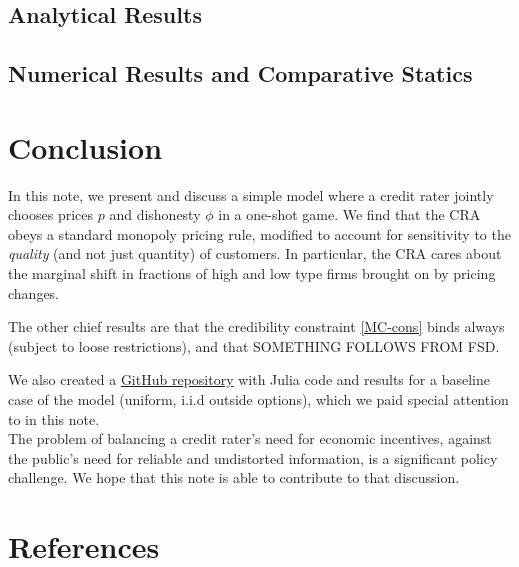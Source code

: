 \documentclass{article}
\theoremstyle{definition}
\begin{document}
\subsection{Analytical Results}

\subsection{Numerical Results and Comparative Statics}

\newpage

\section{Conclusion}

In this note, we present and discuss a simple model where a credit rater jointly chooses prices $p$ and dishonesty $\phi$ in a one-shot game. We find that the CRA obeys a standard monopoly pricing rule, modified to account for sensitivity to the \emph{quality} (and not just quantity) of customers. In particular, the CRA cares about the marginal shift in fractions of high and low type firms brought on by pricing changes.

The other chief results are that the credibility constraint \eqref{MC-cons} binds always (subject to loose restrictions), and that {SOMETHING FOLLOWS FROM FSD.}

We also created a \href{https://github.com/arnavs/credit}{\color{blue} GitHub repository} with Julia code and results for a baseline case of the model (uniform, i.i.d outside options), which we paid special attention to in this note. \\ 

The problem of balancing a credit rater's need for economic incentives, against the public's need for reliable and undistorted information, is a significant policy challenge. We hope that this note is able to contribute to that discussion.

\newpage

\section{References}

\newpage

\end{document}

